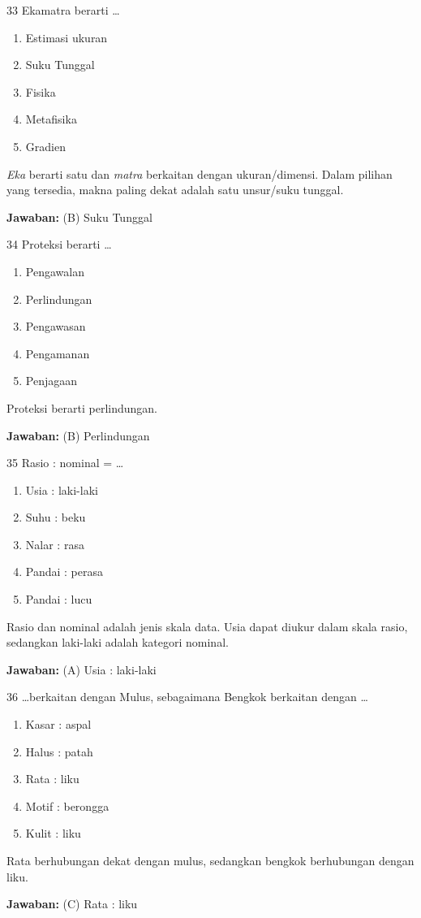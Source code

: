 \documentclass[11pt]{article}
\newenvironment{pil}{\begin{enumerate}[label=(\Alph*),leftmargin=*,itemsep=1pt,topsep=3pt]}{\end{enumerate}}
\newcommand{\jw}[1]{\par\smallskip\begin{jawbox}\textbf{Jawaban:} #1\end{jawbox}}
\begin{document}
\begin{soalbox}{3}{3}
Ekamatra berarti \ldots
\begin{pil}\item Estimasi ukuran \item Suku Tunggal \item Fisika \item Metafisika \item Gradien\end{pil}
\end{soalbox}
\begin{pembox}
\emph{Eka} berarti satu dan \emph{matra} berkaitan dengan ukuran/dimensi. Dalam pilihan yang tersedia, makna paling dekat adalah satu unsur/suku tunggal.
\jw{(B) Suku Tunggal}
\end{pembox}

\begin{soalbox}{3}{4}
Proteksi berarti \ldots
\begin{pil}\item Pengawalan \item Perlindungan \item Pengawasan \item Pengamanan \item Penjagaan\end{pil}
\end{soalbox}
\begin{pembox}
Proteksi berarti perlindungan.
\jw{(B) Perlindungan}
\end{pembox}

\begin{soalbox}{3}{5}
Rasio : nominal = \ldots
\begin{pil}\item Usia : laki-laki \item Suhu : beku \item Nalar : rasa \item Pandai : perasa \item Pandai : lucu\end{pil}
\end{soalbox}
\begin{pembox}
Rasio dan nominal adalah jenis skala data. Usia dapat diukur dalam skala rasio, sedangkan laki-laki adalah kategori nominal.
\jw{(A) Usia : laki-laki}
\end{pembox}

\begin{soalbox}{3}{6}
\ldots berkaitan dengan Mulus, sebagaimana Bengkok berkaitan dengan \ldots
\begin{pil}\item Kasar : aspal \item Halus : patah \item Rata : liku \item Motif : berongga \item Kulit : liku\end{pil}
\end{soalbox}
\begin{pembox}
Rata berhubungan dekat dengan mulus, sedangkan bengkok berhubungan dengan liku.
\jw{(C) Rata : liku}
\end{pembox}
\end{document}
